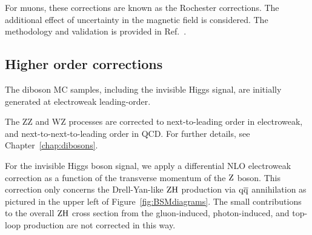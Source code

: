 For muons, these corrections are known as the Rochester corrections.
The additional effect of uncertainty in the magnetic field is considered.
The methodology and validation is provided in Ref.~\cite{Bodek:2012id}.

\subsection{Higher order corrections}
\label{sec:higher-order-corrections}
The diboson MC samples, including the invisible Higgs signal, are initially generated at electroweak leading-order.

The ZZ and WZ processes are corrected to next-to-leading order in electroweak,
and next-to-next-to-leading order in QCD.
For further details, see Chapter~\ref{chap:dibosons}. 


For the invisible Higgs boson signal, we apply a differential NLO electroweak correction as a function of the transverse momentum of the $\mathrm{Z}$ boson.
This correction only concerns the Drell-Yan-like $\mathrm{Z}\mathrm{H}$ production via $\mathrm{q}\mathrm{\overline{q}}$ annihilation
as pictured in the upper left of Figure~\ref{fig:BSMdiagrams}.
The small contributions to the overall $\mathrm{Z}\mathrm{H}$ cross section from the gluon-induced, photon-induced, and top-loop production are not corrected in this way.

